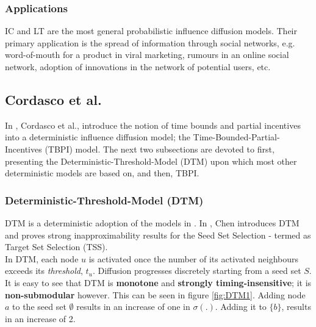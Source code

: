 \documentclass[twocolumn, 10pt]{article}
\begin{document}
\subsubsection{Applications}
IC and LT are the most general probabilistic influence diffusion models. Their primary application is the spread of information through social networks, e.g. word-of-mouth for a product in viral marketing, rumours in an online social network, adoption of innovations in the network of potential users, etc.
\subsection{Cordasco et al. \cite{cordasco}}
In \cite{cordasco}, Cordasco et al., introduce the notion of time bounds and partial incentives into a deterministic influence diffusion model; the Time-Bounded-Partial-Incentives (TBPI) model. The next two subsections are devoted to first, presenting the Deterministic-Threshold-Model (DTM) upon which most other deterministic models are based on, and then, TBPI.
\subsubsection{Deterministic-Threshold-Model (DTM)}
DTM is a deterministic adoption of the models in \cite{kempe}. In \cite{chen}, Chen introduces DTM and proves strong inapproximability results for the Seed Set Selection - termed as Target Set Selection (TSS). \\
In DTM, each node $u$ is activated once the number of its activated neighbours exceeds its \textit{threshold}, $t_u$. Diffusion progresses discretely starting from a seed set $S$. \\
It is easy to see that DTM is \textbf{monotone} and \textbf{strongly timing-insensitive}; it is \textbf{non-submodular} however. This can be seen in figure \ref{fig:DTM1}. Adding node $a$ to the seed set $\emptyset$ results in an increase of one in $\sigma(.)$. Adding it to $\{b\}$, results in an increase of 2.
\end{document}
